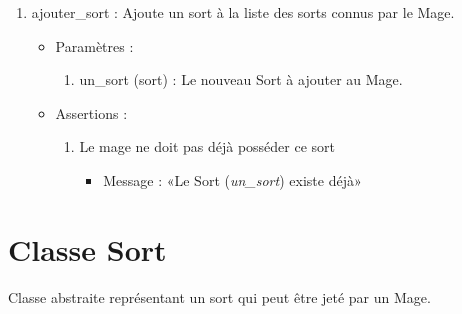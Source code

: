 \documentclass[12pt,pdftex,oneside]{article}
\begin{document}
\begin{itemize}
\begin{enumerate}
    \item ajouter\_sort : Ajoute un sort à la liste des sorts connus par le Mage.
      \begin{itemize}
      \item Paramètres : 
        \begin{enumerate}
        \item un\_sort (sort) : Le nouveau Sort à ajouter au Mage.
        \end{enumerate}
      \item Assertions : 
        \begin{enumerate}
        \item Le mage ne doit pas déjà posséder ce sort
          \begin{itemize}
          \item Message : «Le Sort (\emph{un\_sort}) existe déjà»
          \end{itemize}
        \end{enumerate}
      \end{itemize}

    \end{enumerate}
  \end{itemize}

  \section {Classe Sort}

  Classe abstraite représentant un sort qui peut être jeté par un Mage.
\end{document}

